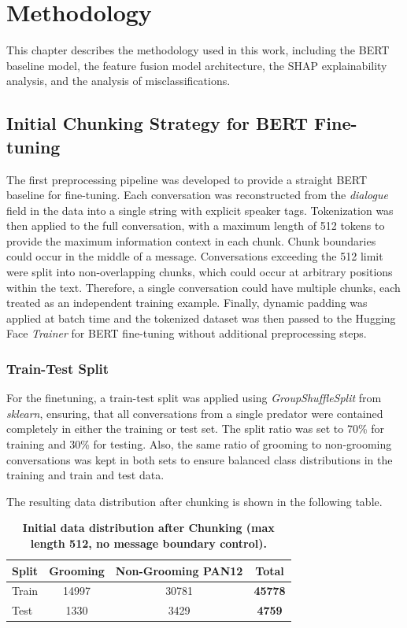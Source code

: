 \chapter{Methodology} \label{sec:methodology}
This chapter describes the methodology used in this work, including the BERT baseline model, the feature fusion model architecture, the SHAP explainability analysis, and the analysis of misclassifications.
\section{Initial Chunking Strategy for BERT Fine-tuning}

The first preprocessing pipeline was developed to provide a straight BERT baseline for fine-tuning. Each conversation was reconstructed from the \textit{dialogue} field in the data into a single string with explicit speaker tags. Tokenization was then applied to the full conversation, with a maximum length of 512 tokens to provide the maximum information context in each chunk. Chunk boundaries could occur in the middle of a message. Conversations exceeding the 512 limit were split into non-overlapping chunks, which could occur at arbitrary positions within the text. Therefore, a single conversation could have multiple chunks, each treated as an independent training example. Finally, dynamic padding was applied at batch time and the tokenized dataset was then passed to the Hugging Face \textit{Trainer} for BERT fine-tuning without additional preprocessing steps.


\subsection{Train-Test Split}
For the finetuning, a train-test split was applied using \textit{GroupShuffleSplit} from \textit{sklearn}, ensuring, that all conversations from a single predator were contained completely in either the training or test set.  The split ratio was set to 70\% for training and 30\% for testing. Also, the same ratio of grooming to non-grooming conversations was kept in both sets to ensure balanced class distributions in the training and train and test data.

The resulting data distribution after chunking is shown in the following table.

\begin{table}[H] 
\label{tab:initial_split} 
\centering
\small
\caption[Initial data distribution after chunking]{\textbf{Initial data distribution after Chunking (max length 512, no message boundary control).}}
\begin{tabular}{lccc}
\hline
Split & Grooming & Non-Grooming PAN12  & \textbf{Total} \\
\hline
Train & 14997 & 30781  & \textbf{45778} \\
Test  & 1330 & 3429   & \textbf{4759} \\
\end{tabular}
\end{table}

